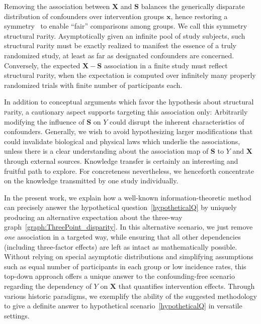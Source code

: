 \documentclass[10pt]{article}
\begin{document}
Removing the association between $\boldsymbol X$ and $\boldsymbol S$ balances the generically disparate distribution of confounders over intervention groups $\boldsymbol x$, hence restoring a symmetry~\cite{jaynes2003probability} to enable ``fair'' comparisons among groups. We call this symmetry structural \textsc{p}arity.
Asymptotically given an infinite pool of study subjects, such structural \textsc{p}arity must be exactly realized to manifest the essence of a truly randomized study, at least as far as designated confounders are concerned. Conversely, the expected $\boldsymbol X-\boldsymbol S$ association in a finite study must reflect structural \textsc{p}arity, when the expectation is computed over infinitely many properly randomized trials with finite number of participants each. 

In addition to  conceptual arguments which favor the hypothesis about structural \textsc{p}arity, a cautionary aspect supports targeting this association only:  
Arbitrarily modifying the influence of $\boldsymbol S$ on $Y$ could disrupt the  inherent characteristics of confounders. 
Generally, we  wish to avoid hypothesizing larger modifications that could invalidate biological and physical laws which underlie the associations, unless there is a clear understanding about the association map of $\boldsymbol S$ to $Y$ and $\boldsymbol X$ through external sources. Knowledge transfer is certainly an interesting and fruitful path to explore. For concreteness nevertheless, we henceforth concentrate on the knowledge transmitted by one study individually.

In the present work, we explain how a well-known information-theoretic method can precisely answer the hypothetical question~\ref{hypotheticalQ} by uniquely producing an  alternative expectation about the three-way graph~\ref{graph:ThreePoint_disparity}. In this alternative scenario,  we just remove \textit{one} association in a targeted way, while ensuring that all other dependencies  (including three-factor effects) are left as intact as mathematically possible. 
Without relying on special asymptotic distributions and simplifying assumptions such as equal number of participants in each group or low incidence rates,
this top-down approach offers a unique answer to the  confounding-free scenario %
regarding the dependency of $Y$ on $\boldsymbol X$ that quantifies intervention effects. 
Through various historic paradigms, we exemplify the ability of the suggested methodology to give a definite answer to hypothetical scenario~\ref{hypotheticalQ}  in versatile settings. 
\end{document}
